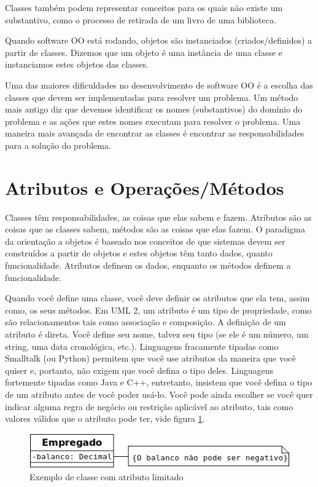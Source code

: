 \documentclass[
	11pt,				%
	openright,
	twoside,			%
	a4paper,			%
	english,			%
	french,
	brazil,				%
	sumario=tradicional
	]{abntex2}
\begin{document}
Classes também podem representar conceitos para os quais não existe um substantivo, como o processo de retirada de um livro de uma biblioteca.

Quando software OO está rodando, objetos são instanciados (criados/definidos) a partir de classes. Dizemos que um objeto é uma instância de uma classe e instanciamos estes objetos das classes.

Uma das maiores dificuldades no desenvolvimento de software OO é a escolha das classes que devem ser implementadas para resolver um problema. Um método mais antigo diz que devemos identificar os nomes (substantivos) do domínio do problema e as ações que  estes nomes executam para resolver o problema. Uma maneira mais avançada de encontrar as classes é encontrar as responsabilidades para a solução do problema.

\section{Atributos e Operações/Métodos}

Classes têm responsabilidades, as coisas que elas sabem e fazem. Atributos são as coisas que as classes sabem, métodos são as coisas que elas fazem. O paradigma da orientação a objetos é baseado nos conceitos de que sistemas devem ser construídos a partir de objetos e estes objetos têm tanto dados, quanto funcionalidade. Atributos definem os dados, enquanto os métodos definem a funcionalidade.

Quando você define uma classe, você deve definir os atributos que ela tem, assim como, os seus métodos. Em UML 2, um atributo é um tipo de propriedade, como são relacionamentos tais como associação e composição. A definição de um atributo é direta. Você define seu nome, talvez seu tipo (se ele é um número, um string, uma data cronológica, etc.).  Linguagens fracamente tipadas como Smalltalk (ou Python) permitem que você use atributos da maneira que você quiser e, portanto, não exigem que você defina o tipo deles. Linguagens fortemente tipadas como Java e C++, entretanto, insistem que você defina o tipo de um atributo antes de você poder usá-lo. Você pode ainda escolher se você quer indicar alguma regra de negócio ou restrição aplicável ao atributo, tais como valores válidos que o atributo pode ter, vide figura \ref{fig:umlClsLmt}.

\begin{figure}[h]
\begin{center}
\includegraphics[scale=0.7]{umlClsLmt.png} 
\caption{Exemplo de classe com atributo limitado} \label{fig:umlClsLmt}
\end{center}
\end{figure}
\end{document}
